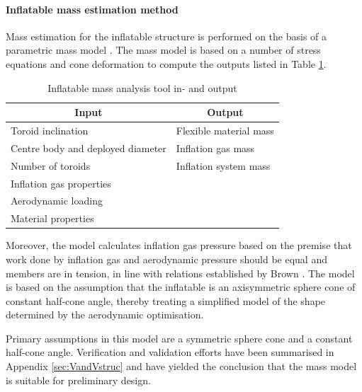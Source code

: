 \paragraph{Inflatable mass estimation method}

Mass estimation for the inflatable structure is performed on the basis of a parametric mass model \cite{Samareh2011}. The mass model is based on a number of stress equations and cone deformation to compute the outputs listed in Table \ref{tab:inflmass}.
\begin{table}[ht]
\caption{Inflatable mass analysis tool in- and output}
\centering
\begin{tabular}{|l||l|}
\hline
\multicolumn{1}{|c||}{{\bf Input}} & \multicolumn{1}{c|}{{\bf Output}} \\ \hline \hline
Toroid inclination         & Flexible material mass            \\ \hline
Centre body and deployed diameter        & Inflation gas mass                 \\ \hline
Number of toroids                 & Inflation system mass                \\ \hline
Inflation gas properties              &              \\ \hline
Aerodynamic loading               &                                   \\ \hline
Material properties  &                                   \\ \hline
\end{tabular}
\label{tab:inflmass}
\end{table}
Moreover, the model calculates inflation gas pressure based on the premise that work done by inflation gas and aerodynamic pressure should be equal and members are in tension, in line with relations established by Brown \cite{Brown2009}. The model is based on the assumption that the inflatable is an axisymmetric sphere cone of constant half-cone angle, thereby treating a simplified model of the shape determined by the aerodynamic optimisation.

Primary assumptions in this model are a symmetric sphere cone and a constant half-cone angle. Verification and validation efforts have been summarised in Appendix \ref{sec:VandVstruc} and have yielded the conclusion that the mass model is suitable for preliminary design.











